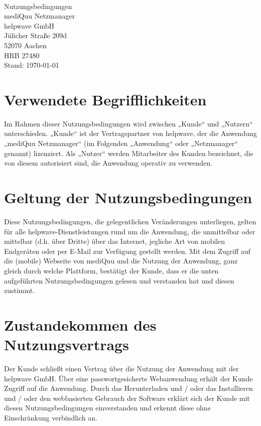 \documentclass[10pt]{article}
\begin{document}
\begin{center}
	\\[4ex]
	{\Huge \sffamily
	Nutzungsbedingungen \\
	\huge mediQuu Netzmanager}\\[2ex]

	\vspace{1em}
	{\large
		helpwave GmbH \\
		Jülicher Straße 209d \\
		52070 Aachen \\
		HRB 27480}\\
	\vspace{1em}
	Stand: \today
\end{center}

\vspace{2ex}

\tableofcontents

\newpage

\section{Verwendete Begrifflichkeiten}
Im Rahmen dieser Nutzungsbedingungen wird zwischen „Kunde“ und „Nutzern“ unterschieden. „Kunde“ ist der Vertragspartner von helpwave, der die Anwendung „mediQuu Netzmanager“ (im Folgenden „Anwendung“ oder „Netzmanager“ genannt) lizenziert. Als „Nutzer“ werden Mitarbeiter des Kunden bezeichnet, die von diesem autorisiert sind, die Anwendung operativ zu verwenden.
\section{Geltung der Nutzungsbedingungen}
Diese Nutzungsbedingungen, die gelegentlichen Veränderungen unterliegen, gelten für alle helpwave-Dienstleistungen rund
um die Anwendung, die unmittelbar oder mittelbar (d.h. über Dritte) über das Internet, jegliche Art von mobilen Endgeräten
oder per E-Mail zur Verfügung gestellt werden. Mit dem Zugriff auf die (mobile) Webseite von mediQuu und die Nutzung der
Anwendung, ganz gleich durch welche Plattform, bestätigt der Kunde, dass er die unten aufgeführten Nutzungsbedingungen gelesen und verstanden hat und diesen zustimmt.
\section{Zustandekommen des Nutzungsvertrags}
Der Kunde schließt einen Vertrag über die Nutzung der Anwendung mit der helpwave GmbH. Über eine passwortgesicherte Webanwendung erhält der Kunde Zugriff auf die Anwendung. Durch das Herunterladen und / oder das Installieren und / oder den webbasierten Gebrauch der Software erklärt sich der Kunde mit diesen Nutzungsbedingungen einverstanden und erkennt diese ohne Einschränkung verbindlich an.
\end{document}
